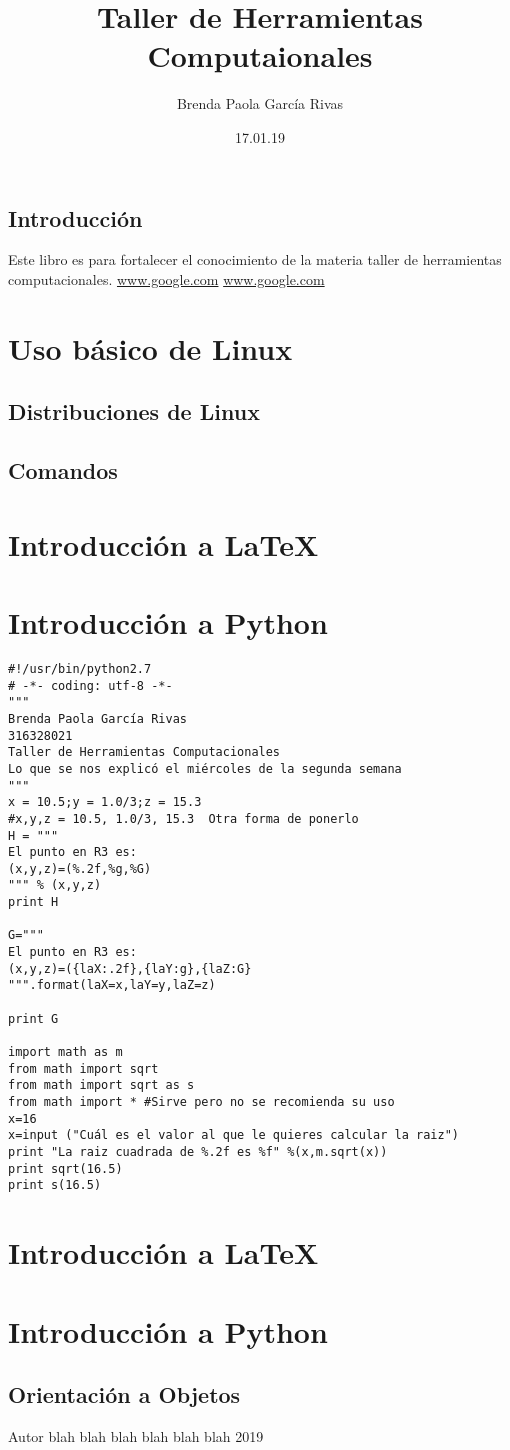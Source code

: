 \documentclass{book}
\title{Taller de Herramientas Computaionales}
\author{Brenda Paola García Rivas}
\date{17.01.19}
\begin{document}
\maketitle
\tableofcontents
\section*{Introducción} Este libro es para fortalecer el conocimiento de la materia taller de herramientas computacionales.
\url{www.google.com}
\hyperref[Google]{www.google.com}

\chapter{Uso básico de Linux}
\section{Distribuciones de Linux}
\section{Comandos}
\chapter{Introducción a LaTeX}
\chapter{Introducción a Python}

\begin{verbatim}
#!/usr/bin/python2.7    
# -*- coding: utf-8 -*-
"""
Brenda Paola García Rivas
316328021
Taller de Herramientas Computacionales
Lo que se nos explicó el miércoles de la segunda semana
"""
x = 10.5;y = 1.0/3;z = 15.3
#x,y,z = 10.5, 1.0/3, 15.3  Otra forma de ponerlo 
H = """
El punto en R3 es:
(x,y,z)=(%.2f,%g,%G)
""" % (x,y,z)
print H

G="""
El punto en R3 es:
(x,y,z)=({laX:.2f},{laY:g},{laZ:G}
""".format(laX=x,laY=y,laZ=z)

print G

import math as m
from math import sqrt
from math import sqrt as s
from math import * #Sirve pero no se recomienda su uso
x=16
x=input ("Cuál es el valor al que le quieres calcular la raiz")
print "La raiz cuadrada de %.2f es %f" %(x,m.sqrt(x))
print sqrt(16.5)
print s(16.5)
\end{verbatim}

%


\chapter{Introducción a LaTeX}
\chapter{Introducción a Python}
\section{Orientación a Objetos}

\begin{thebibliography}{9}
Autor blah blah blah 
blah blah blah 2019
\end{thebibliography}
\end{document}
